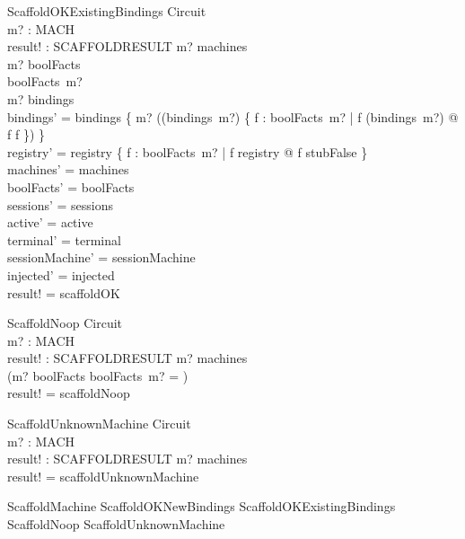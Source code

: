 \documentclass[a4paper,10pt,fleqn]{article}
\begin{document}
\begin{schema}{ScaffoldOKExistingBindings}
  \Delta Circuit \\
  m? : MACH \\
  result! : SCAFFOLDRESULT
\where
  m? \in machines \\
  m? \in \dom boolFacts \\
  boolFacts~m? \neq \emptyset \\
  m? \in \dom bindings \\
  bindings' = bindings \oplus
    \{ m? \mapsto ((bindings~m?) \oplus
      \{ f : boolFacts~m? | f \notin \dom (bindings~m?) @ f \mapsto f \}) \} \\
  registry' = registry \oplus
    \{ f : boolFacts~m? | f \notin \dom registry @ f \mapsto stubFalse \} \\
  machines' = machines \\
  boolFacts' = boolFacts \\
  sessions' = sessions \\
  active' = active \\
  terminal' = terminal \\
  sessionMachine' = sessionMachine \\
  injected' = injected \\
  result! = scaffoldOK
\end{schema}

\begin{schema}{ScaffoldNoop}
  \Xi Circuit \\
  m? : MACH \\
  result! : SCAFFOLDRESULT
\where
  m? \in machines \\
  (m? \notin \dom boolFacts \lor boolFacts~m? = \emptyset) \\
  result! = scaffoldNoop
\end{schema}

\begin{schema}{ScaffoldUnknownMachine}
  \Xi Circuit \\
  m? : MACH \\
  result! : SCAFFOLDRESULT
\where
  m? \notin machines \\
  result! = scaffoldUnknownMachine
\end{schema}

\begin{zed}
  ScaffoldMachine  ScaffoldOKNewBindings \lor ScaffoldOKExistingBindings
    \lor ScaffoldNoop \lor ScaffoldUnknownMachine
\end{zed}
\end{document}
